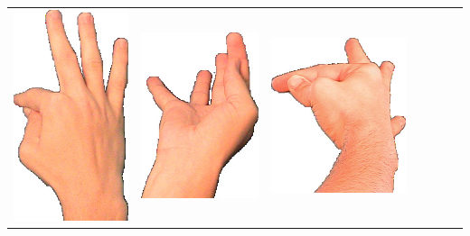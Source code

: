 \documentclass{article}
\begin{document}
\begin{center}
\begin{tabular}{r*{6}{c}}
\includegraphics[scale=0.1]{images/09-02-3.jpg}&
\includegraphics[scale=0.1]{images/09-02-4.jpg}&
\includegraphics[scale=0.1]{images/09-02-5.jpg}&

\end{tabular}
\end{center}
\end{document}
